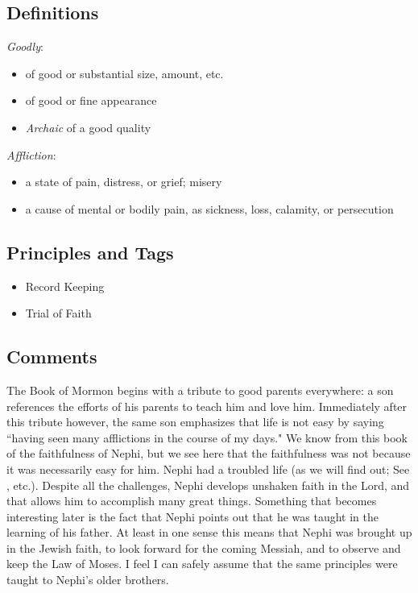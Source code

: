 \documentclass[12pt]{report}
\begin{document}
\subsection{Definitions\label{1Nephi1:1:DFN}}
\emph{Goodly}: \begin{itemize}
\item of good or substantial size, amount, etc.
\item of good or fine appearance
\item \emph{Archaic} of a good quality
\end{itemize}
\emph{Affliction}: \begin{itemize}
\item a state of pain, distress, or grief; misery
\item a cause of mental or bodily pain, as sickness, loss, calamity, or persecution
\end{itemize}

\subsection{Principles and Tags\label{1Nephi1:1:principles}}
\begin{itemize}
\item {}Record Keeping
\item {}Trial of Faith
\end{itemize}

\subsection{Comments\label{1Nephi1:1:comments}}
The Book of Mormon begins with a tribute to good parents everywhere: a son references the efforts of his parents to teach him and love him.  Immediately after this tribute however, the same son emphasizes that life is not easy by saying ``having seen many afflictions in the course of my days."  We know from this book of the faithfulness of Nephi, but we see here that the faithfulness was not because it was necessarily easy for him.  Nephi had a troubled life (as we will find out; See , etc.).  Despite all the challenges, Nephi develops unshaken faith in the Lord, and that allows him to accomplish many great things.  Something that becomes interesting later is the fact that Nephi points out that he was taught in the learning of his father.  At least in one sense this means that Nephi was brought up in the Jewish faith, to look forward for the coming Messiah, and to observe and keep the Law of Moses.  I feel I can safely assume that the same principles were taught to Nephi's older brothers.
\end{document}
